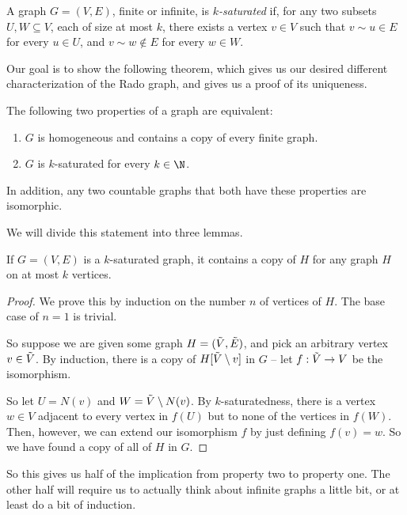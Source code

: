 \documentclass[nobib]{tufte-handout}
\begin{document}
\begin{definition}
    A graph $G = (V,E)$, finite or infinite, is \emph{$k$-saturated} if, for any two subsets $U, W \subseteq V$, each of size at most $k$, there exists a vertex $v \in V$ such that $v \sim u \in E$ for every $u \in U$, and $v \sim w \not\in E$ for every $w \in W$.
\end{definition}

Our goal is to show the following theorem, which gives us our desired different characterization of the Rado graph, and gives us a proof of its uniqueness.

\begin{theorem}
    The following two properties of a graph are equivalent:
    \begin{enumerate}
        \item $G$ is homogeneous and contains a copy of every finite graph.
        \item $G$ is $k$-saturated for every $k \in \N$.
    \end{enumerate}

    In addition, any two countable graphs that both have these properties are isomorphic.
\end{theorem}

We will divide this statement into three lemmas.

\begin{lemma}
    If $G = (V,E)$ is a $k$-saturated graph, it contains a copy of $H$ for any graph $H$ on at most $k$ vertices.

    \begin{proof}
        We prove this by induction on the number $n$ of vertices of $H$. The base case of $n = 1$ is trivial.

        So suppose we are given some graph $H = (\Tilde V, \Tilde E)$, and pick an arbitrary vertex $v \in \Tilde V$. By induction, there is a copy of $H[\Tilde V \setminus v]$ in $G$ -- let $f: \Tilde V \to V$ be the isomorphism. 
        
        So let $U = N(v)$ and $W = \Tilde V \setminus N(v)$. By $k$-saturatedness, there is a vertex $w \in V$ adjacent to every vertex in $f(U)$ but to none of the vertices in $f(W)$. Then, however, we can extend our isomorphism $f$ by just defining $f(v) = w$. So we have found a copy of all of $H$ in $G$.
    \end{proof}
\end{lemma}

So this gives us half of the implication from property two to property one. The other half will require us to actually think about infinite graphs a little bit, or at least do a bit of induction.
\end{document}
